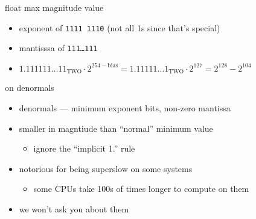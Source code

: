 \begin{frame}{float max magnitude value}
\begin{itemize}
\item exponent of {\tt 1111 1110}  (not all 1s since that's special) 
\item mantisssa of {\tt 111\ldots111}
\item $1.111111\ldots11_\text{TWO} \cdot 2^{254-\text{bias}} = 1.11111\ldots1_\text{TWO} \cdot 2^{127} = 2^{128} - 2^{104}$
\end{itemize}
\end{frame}

\begin{frame}{on denormals}
\begin{itemize}
\item denormals --- minimum exponent bits, non-zero mantissa
\item smaller in magntiude than ``normal'' minimum value
    \begin{itemize}
    \item ignore the ``implicit 1.'' rule
    \end{itemize}
\item notorious for being superslow on some systems
    \begin{itemize}
    \item some CPUs take 100s of times longer to compute on them
    \end{itemize}
\item we won't ask you about them
\end{itemize}
\end{frame}

